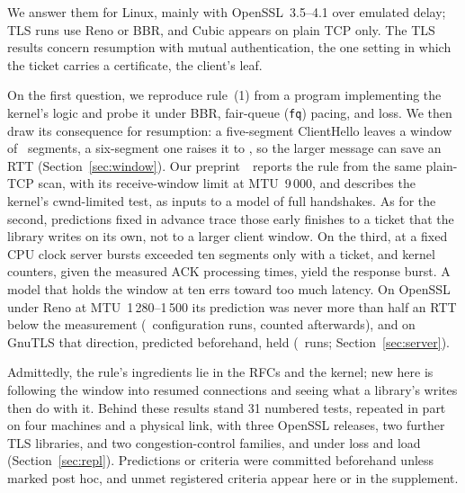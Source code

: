 \documentclass[sigconf,9pt,nonacm]{acmart}
\newcommand{\citeone}{\cite{paperone}}
\begin{document}
We answer them for Linux, mainly with OpenSSL~3.5--4.1 over emulated delay; TLS runs use Reno or BBR, and Cubic appears on plain TCP only. The TLS results concern resumption with mutual authentication, the one setting in which the ticket carries a certificate, the client's leaf.

On the first question, we reproduce rule~(1) from a program implementing the kernel's logic and probe it under BBR, fair-queue (\texttt{fq}) pacing, and loss. We then draw its consequence for resumption: a five-segment ClientHello leaves a window of \WFive\ segments, a six-segment one raises it to \WSix, so the larger message can save an RTT (Section~\ref{sec:window}). Our preprint~\citeone\ reports the rule from the same plain-TCP scan, with its receive-window limit at MTU~9\,000, and describes the kernel's cwnd-limited test, as inputs to a model of full handshakes.
As for the second, predictions fixed in advance trace those early finishes to a ticket that the library writes on its own, not to a larger client window.
On the third, at a fixed CPU clock server bursts exceeded ten segments only with a ticket, and kernel counters, given the measured ACK processing times, yield the response burst. A model that holds the window at ten errs toward too much latency. On OpenSSL under Reno at MTU~1\,280--1\,500 its prediction was never more than half an RTT below the measurement (\OsRuns\ configuration runs, counted afterwards), and on GnuTLS that direction, predicted beforehand, held (\GtlsFastCellRuns\ runs; Section~\ref{sec:server}).

Admittedly, the rule's ingredients lie in the RFCs and the kernel; new here is following the window into resumed connections and seeing what a library's writes then do with it. Behind these results stand 31 numbered tests, repeated in part on four machines and a physical link, with three OpenSSL releases, two further TLS libraries, and two congestion-control families, and under loss and load (Section~\ref{sec:repl}). Predictions or criteria were committed beforehand unless marked post hoc, and unmet registered criteria appear here or in the supplement.
\end{document}
